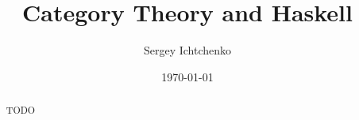\documentclass[english, twoside]{HYthesis}
\title{Category Theory and Haskell}
\author{Sergey Ichtchenko}
\date{\today}
\theoremstyle{definition}
\theoremstyle{plain}
\begin{document}
\maketitle

\begin{abstract}
TODO
\end{abstract}

\mytableofcontents





\clearpage
{} %

\end{document}
